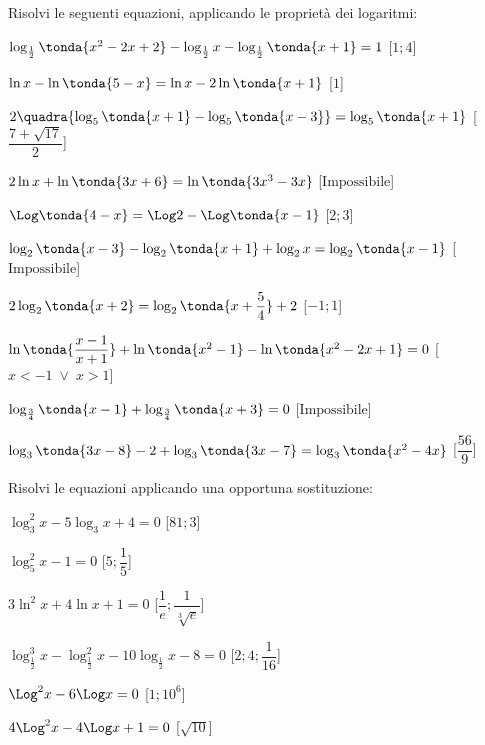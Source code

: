 \begin{esercizio}\label{ese:}
 Risolvi le seguenti equazioni, applicando le proprietà dei logaritmi:
 \begin{enumeratea}
   \item \(\log_{\frac{1}{2}} \tonda{x^2-2x+2}-\log_{\frac{1}{2}} x- 
\log_{\frac{1}{2}} \tonda{x+1}=1\)
   \hfill [\(1;4\)]
   \item \(\ln x-\ln \tonda{5-x}=\ln x-2\ln  \tonda{x+1}\)
   \hfill [\(1\)]
   \item \(2 \quadra{\log_5 \tonda{x+1}-\log_5 \tonda{x-3}}=\log_5 
\tonda{x+1}\)
   \hfill [\(\dfrac{7+\sqrt{17}}{2}\)]
   \item \(2 \ln x+\ln \tonda{3x+6}=\ln \tonda{3x^3-3x}\)
   \hfill [\(\text{Impossibile}\)]
   \item \(\Log \tonda{4-x}=\Log 2 -\Log \tonda{x-1}\)
   \hfill [\(2 ;3\)]
   \item \(\log_2 \tonda{x-3} -\log_2 \tonda{x+1}+\log_2 x = \log_2 
\tonda{x-1}\)
   \hfill [\(\text{Impossibile}\)]
   \item \(2 \log_2 \tonda{x+2}=\log_2 \tonda{x+\dfrac{5}{4}}+2\)
   \hfill [\(-1;1\)]
   \item \(\ln \tonda{\dfrac{x-1}{x+1}}+\ln \tonda{x^2-1}-\ln 
\tonda{x^2-2x+1}=0\)
   \hfill [\(x<-1 \;\lor\; x>1\)]
   \item \(\log_{\frac{3}{4}} 
\tonda{x-1}+\log_{\frac{3}{4}}\tonda{x+3}=0\)
   \hfill [\(\text{Impossibile}\)]
   \item \(\log_3 \tonda{3x-8}-2+\log_3 \tonda{3x-7}=\log_3 \tonda{x^2-4x}\)
   \hfill [\(\dfrac{56}{9}\)]
 \end{enumeratea}
\end{esercizio}

\begin{esercizio}\label{ese:}
 Risolvi le equazioni applicando una opportuna sostituzione:
 \begin{enumeratea}
  \item  \(\log_3^2 x-5 \log_3 x+4=0\)
   \hfill [\(81;3\)]
  \item  \(\log_5^2 x-1=0\)
   \hfill [\(5;\dfrac{1}{5}\)]
   \item  \(3\ln^2 x+4 \ln x+1=0\)
   \hfill [\(\dfrac{1}{e};\dfrac{1}{\sqrt[3]{e}}\)]
   \item  \(\log_{\frac{1}{2}}^3 x-\log_{\frac{1}{2}}^2 
x-10\log_{\frac{1}{2}} x-8=0\)
   \hfill [\(2;4;\dfrac{1}{16}\)]
   \item  \(\Log^2 x-6\Log x=0\)
   \hfill [\(1;10^6\)]
   \item  \(4 \Log^2 x-4\Log x+1=0\)
   \hfill [\(\sqrt{10}\)]
 \end{enumeratea}
\end{esercizio}

